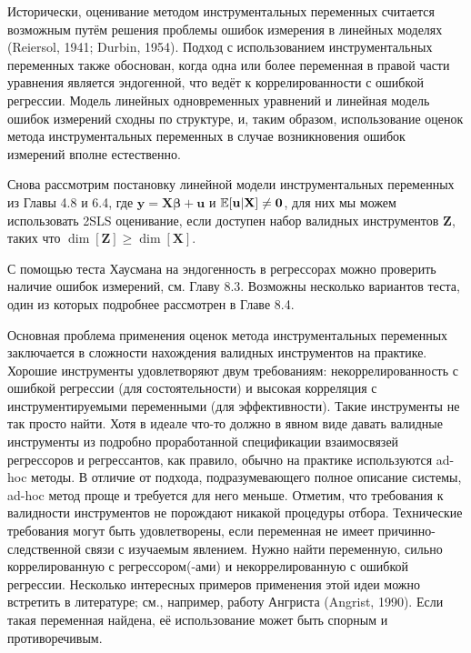 Исторически, оценивание методом инструментальных переменных считается возможным путём решения проблемы ошибок измерения в линейных моделях (Reiersol, 1941; Durbin, 1954). Подход с использованием инструментальных переменных также обоснован, когда одна или более переменная в правой части уравнения является эндогенной, что ведёт к коррелированности с ошибкой регрессии. Модель линейных одновременных уравнений и линейная модель ошибок измерений сходны по структуре, и, таким образом, использование оценок метода инструментальных переменных в случае возникновения ошибок измерений вполне естественно.

Снова рассмотрим постановку линейной модели инструментальных переменных из Главы 4.8 и 6.4, где $\mathbf{y=X\beta+u}$ и $\mathbb{E}[\mathbf{u|X}] \neq \mathbf{0}$, для них мы можем использовать 2SLS оценивание, если доступен набор валидных инструментов $\mathbf{Z}$, таких что $\dim[\mathbf{Z}] \geqslant \dim[\mathbf{X}]$.

С помощью теста Хаусмана на эндогенность в регрессорах можно проверить наличие ошибок измерений, см. Главу 8.3. Возможны несколько вариантов теста, один из которых подробнее рассмотрен в Главе 8.4.

Основная проблема применения оценок метода инструментальных переменных заключается в сложности нахождения валидных инструментов на практике. Хорошие инструменты удовлетворяют двум требованиям: некоррелированность с ошибкой регрессии (для состоятельности) и высокая корреляция с инструментируемыми переменными (для эффективности). Такие инструменты не так просто найти. Хотя в идеале что-то должно в явном виде давать валидные инструменты из подробно проработанной спецификации взаимосвязей регрессоров и регрессантов, как правило, обычно на практике используются ad-hoc методы. В отличие от подхода, подразумевающего полное описание системы, ad-hoc метод проще и требуется для него меньше. Отметим, что требования к валидности инструментов не порождают никакой процедуры отбора. Технические требования могут быть удовлетворены, если переменная не имеет причинно-следственной связи с изучаемым явлением. Нужно найти переменную, сильно коррелированную с регрессором(-ами) и некоррелированную с ошибкой регрессии. Несколько интересных примеров применения этой идеи можно встретить в литературе; см., например, работу Ангриста (Angrist, 1990). Если такая переменная найдена, её использование может быть спорным и противоречивым.

